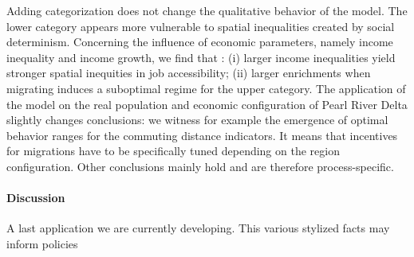  Adding categorization does not change the qualitative behavior of the model. %
 The lower category appears more vulnerable to spatial inequalities created by social determinism. Concerning the influence of economic parameters, namely income inequality and income growth, we find that : (i) larger income inequalities yield stronger spatial inequities in job accessibility; (ii) larger enrichments when migrating induces a suboptimal regime for the upper category. The application of the model on the real population and economic configuration of Pearl River Delta slightly changes conclusions: we witness for example the emergence of optimal behavior ranges for the commuting distance indicators. It means that incentives for migrations have to be specifically tuned depending on the region configuration. Other conclusions mainly hold and are therefore process-specific.



\paragraph{Discussion}

A last application we are currently developing. This various stylized facts may inform policies






